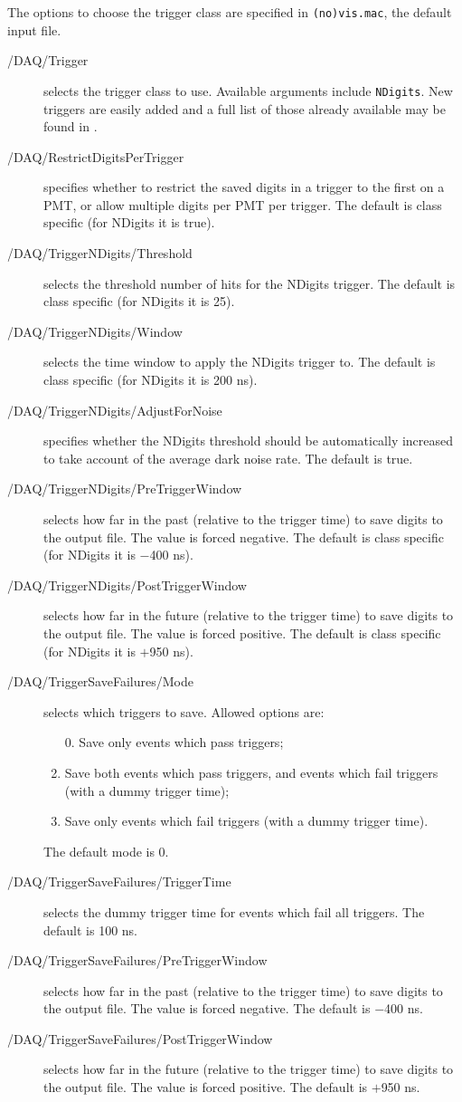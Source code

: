 The options to choose the trigger class are specified in \texttt{(no)vis.mac}, the default input file.
\begin{description}
\item[/DAQ/Trigger] selects the trigger class to use. Available arguments include \texttt{NDigits}. New triggers are easily added and a full list of those already available may be found in .

\item[/DAQ/RestrictDigitsPerTrigger] specifies whether to restrict the saved digits in a trigger to the first on a PMT, or allow multiple digits per PMT per trigger. The default is class specific (for NDigits it is true).

\item[/DAQ/TriggerNDigits/Threshold] selects the threshold number of hits for the NDigits trigger. The default is class specific (for NDigits it is 25).
\item[/DAQ/TriggerNDigits/Window] selects the time window to apply the NDigits trigger to. The default is class specific (for NDigits it is 200 ns).
\item[/DAQ/TriggerNDigits/AdjustForNoise] specifies whether the NDigits threshold should be automatically increased to take account of the average dark noise rate. The default is true.
\item[/DAQ/TriggerNDigits/PreTriggerWindow] selects how far in the past (relative to the trigger time) to save digits to the output file. The value is forced negative. The default is class specific (for NDigits it is $-$400 ns). 
\item[/DAQ/TriggerNDigits/PostTriggerWindow] selects how far in the future (relative to the trigger time) to save digits to the output file. The value is forced positive. The default is class specific (for NDigits it is $+$950 ns). 

\item[/DAQ/TriggerSaveFailures/Mode] selects which triggers to save. Allowed options are:
  \begin{enumerate}
  \item [0.]\setcounter{enumi}{0} Save only events which pass triggers;
  \item Save both events which pass triggers, and events which fail triggers (with a dummy trigger time);
  \item Save only events which fail triggers (with a dummy trigger time).
  \end{enumerate}
The default mode is 0.
\item[/DAQ/TriggerSaveFailures/TriggerTime] selects the dummy trigger time for events which fail all triggers. The default is 100 ns.
\item[/DAQ/TriggerSaveFailures/PreTriggerWindow] selects how far in the past (relative to the trigger time) to save digits to the output file. The value is forced negative. The default is $-$400 ns. 
\item[/DAQ/TriggerSaveFailures/PostTriggerWindow] selects how far in the future (relative to the trigger time) to save digits to the output file. The value is forced positive. The default is $+$950 ns. 
\end{description}

